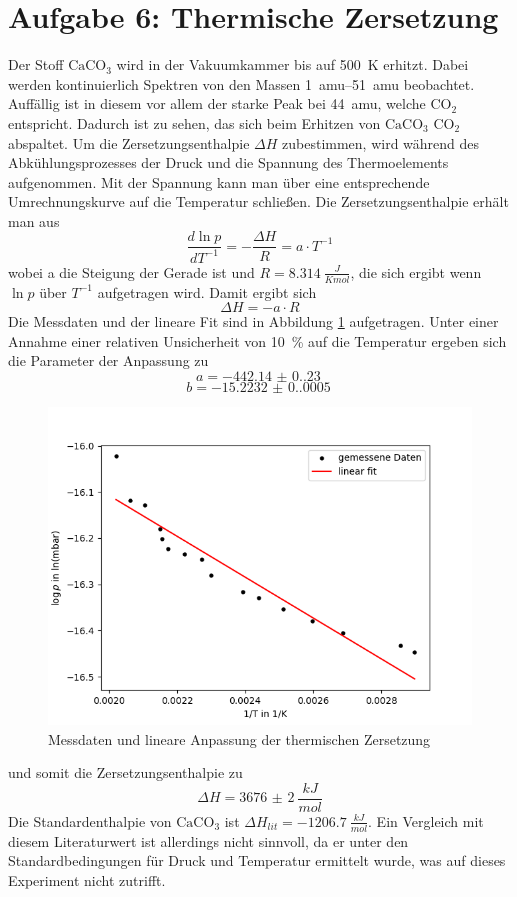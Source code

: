 \section{Aufgabe 6: Thermische Zersetzung}
Der Stoff $\text{CaCO}_3$ wird in der Vakuumkammer bis auf \SI{500}{K} erhitzt. Dabei werden kontinuierlich Spektren von den Massen \SIrange[]{1}{51}{amu} beobachtet. Auffällig ist in diesem vor allem der starke Peak bei \SI{44}{amu}, welche $\text{CO}_2$ entspricht. Dadurch ist zu sehen, das sich beim Erhitzen von $\text{CaCO}_3$ $\text{CO}_2$ abspaltet. Um die Zersetzungsenthalpie $\Delta H$ zubestimmen, wird während des Abkühlungsprozesses der Druck und die Spannung des Thermoelements aufgenommen. Mit der Spannung kann man über eine entsprechende Umrechnungskurve\cite{VorbereitungsMappe} auf die Temperatur schließen. 
Die Zersetzungsenthalpie erhält man aus $$\frac{d \ln{p}}{d T^{-1}} = -\frac{\Delta H}{R} = a\cdot T^{-1}$$ wobei a die Steigung der Gerade ist und $R = \SI{8.314}{\frac{J}{K mol}}$, die sich ergibt wenn $\ln{p}$ über $T^{-1}$ aufgetragen wird. Damit ergibt sich 
$$\Delta H = -a\cdot R$$
Die Messdaten und der lineare Fit sind in Abbildung \ref{fig:MSTherm} aufgetragen. 
Unter einer Annahme einer relativen Unsicherheit von \SI{10}{\%} auf die  Temperatur ergeben sich die Parameter der Anpassung zu
$$a = \SI{-442.14(0.23)}{}$$
$$b = \SI{-15.2232(0.0005)}{}$$

\begin{figure}[H]
    \centering
    \includegraphics[width=120mm,scale=0.8]{Massenspektrometer/include/MSTherm.png}
    \caption{Messdaten und lineare Anpassung der thermischen Zersetzung}
    \label{fig:MSTherm}
\end{figure}
und somit die Zersetzungsenthalpie zu 
$$\Delta H = \SI{3676(2)}{\frac{kJ}{mol}}$$
Die Standardenthalpie von $\text{CaCO}_3$ ist $\Delta H_{lit} = \SI{-1206.7}{\frac{kJ}{mol}}$\cite{Standardenthalpe}. Ein Vergleich mit diesem Literaturwert ist allerdings nicht sinnvoll, da er unter den Standardbedingungen für Druck und Temperatur ermittelt wurde, was auf dieses Experiment nicht zutrifft. 